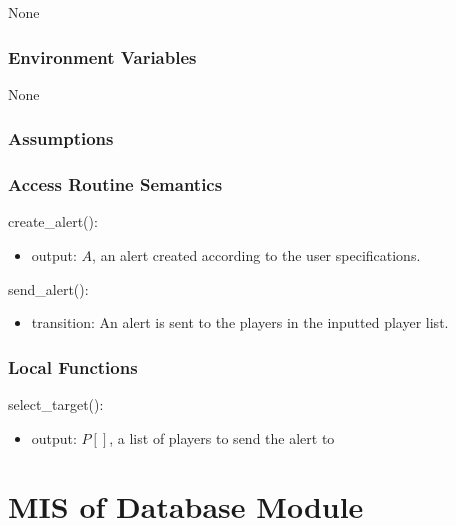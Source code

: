 \documentclass[12pt, titlepage]{article}
\begin{document}
None

\subsubsection{Environment Variables}

None

\subsubsection{Assumptions}


\subsubsection{Access Routine Semantics}

\noindent create\_alert():
\begin{itemize}
\item output: $A$, an alert created according to the user specifications.
\end{itemize}

\noindent send\_alert():
\begin{itemize}
\item transition: An alert is sent to the players in the inputted player list.
\end{itemize}

\subsubsection{Local Functions}

\noindent select\_target():
\begin{itemize}
\item output: $P[]$, a list of players to send the alert to
\end{itemize}

\newpage

\section{MIS of Database Module} \label{mDB}


\end{document}
